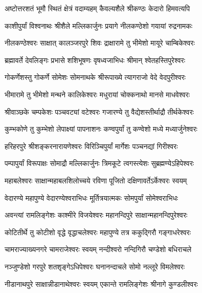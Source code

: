 
\twolineshloka
{अष्टोत्तरशतं भूमौ स्थितं क्षेत्रं वदाम्यहम्}
{कैवल्यशैले श्रीकण्ठः केदारो हिमवत्यपि}

\twolineshloka
{काशीपुर्यां विश्वनाथः श्रीशैले मल्लिकार्जुनः}
{प्रयागे नीलकण्ठेशो गयायां रुद्रनामकः}

\twolineshloka
{नीलकण्ठेश्वरः साक्षात् कालञ्जरपुरे शिवः}
{द्राक्षारामे तु भीमेशो मायूरे चाम्बिकेश्वरः}

\twolineshloka
{ब्रह्मावर्ते देवलिङ्गः प्रभासे शशिभूषणः}
{वृषध्वजाभिधः श्रीमान् श्वेतहस्तिपुरेश्वरः}

\twolineshloka
{गोकर्णेशस्तु गोकर्णे सोमेशः सोमनाथके}
{श्रीरूपाख्ये त्यागराजो वेदे वेदपुरीश्वरः}

\twolineshloka
{भीमारामे तु भीमेशो मन्थने कालिकेश्वरः}
{मधुरायां चोक्कनाथो मानसे माधवेश्वरः}

\twolineshloka
{श्रीवाञ्छके चम्पकेशः पञ्चवट्यां वटेश्वरः}
{गजारण्ये तु वैद्येशस्तीर्थाद्रौ तीर्थकेश्वरः}

\twolineshloka
{कुम्भकोणे तु कुम्भेशो लेपाक्ष्यां पापनाशनः}
{कण्वपुर्यां तु कण्वेशो मध्ये मध्यार्जुनेश्वरः}

\twolineshloka
{हरिहरपुरे श्रीशङ्करनारायणेश्वरः}
{विरिञ्चिपुर्यां मार्गेशः पञ्चनद्यां गिरीश्वरः}

\twolineshloka
{पम्पापुर्यां विरूपाक्षः सोमाद्रौ मल्लिकार्जुनः}
{त्रिमकूटे त्वगस्त्येशः सुब्रह्मण्येऽहिपेश्वरः}

\twolineshloka
{महाबलेश्वरः साक्षान्महाबलशिलोच्चये}
{रविणा पूजितो दक्षिणावर्तेऽर्केश्वरः स्वयम्}

\twolineshloka
{वेदारण्ये महापुण्ये वेदारण्येश्वराभिधः}
{मूर्तित्रयात्मकः सोमपुर्यां सोमेश्वराभिधः}

\twolineshloka
{अवन्त्यां रामलिङ्गेशः काश्मीरे विजयेश्वरः}
{महानन्दिपुरे साक्षान्महानन्दिपुरेश्वरः}

\twolineshloka
{कोटितीर्थे तु कोटीशो वृद्धे वृद्धाचलेश्वरः}
{महापुण्ये तत्र ककुद्गिरौ गङ्गाधरेश्वरः}

\twolineshloka
{चामराज्याख्यनगरे चामराजेश्वरः स्वयम्}
{नन्दीश्वरो नन्दिगिरौ चण्डेशो बधिराचले}

\twolineshloka
{नञ्जुण्डेशो गरपुरे शतशृङ्गेऽधिपेश्वरः}
{घनानन्दाचले सोमो नल्लूरे विमलेश्वरः}

\twolineshloka
{नीडानाथपुरे साक्षान्नीडानाथेश्वरः स्वयम्}
{एकान्ते रामलिङ्गेशः श्रीनागे कुण्डलीश्वरः}

